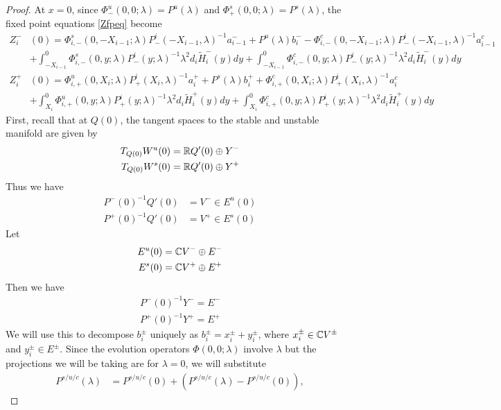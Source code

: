 \documentclass[thesis.tex]{subfiles}
\begin{document}
\begin{lemma}
\begin{proof}
At $x = 0$, since $\Phi^u_-(0, 0; \lambda) = P^u(\lambda)$ and $\Phi^s_+(0, 0; \lambda) = P^s(\lambda)$, 
the fixed point equations \eqref{Zfpeq} become
\begin{align*}
Z_i^-&(0) = \Phi^s_{i,-}(0, -X_{i-1}; \lambda) P^i_-(-X_{i-1}, \lambda)^{-1} a_{i-1}^- + P^u(\lambda) b_i^- - \Phi^c_{i,-}(0, -X_{i-1}; \lambda) P^i_-(-X_{i-1}, \lambda)^{-1} a_{i-1}^c \\
&+ \int_{-X_{i-1}}^0 \Phi^s_{i,-}(0, y; \lambda) P^i_-(y; \lambda)^{-1} \lambda^2 d_i \tilde{H}_i^-(y) dy + \int_{-X_{i-1}}^0 \Phi^c_{i,-}(0, y; \lambda) P^i_-(y; \lambda)^{-1} \lambda^2 d_i \tilde{H}_i^-(y) dy \\
Z_i^+&(0) = \Phi^u_{i,+}(0, X_i; \lambda) P^i_+(X_i, \lambda)^{-1} a_i^+ +  P^s(\lambda)b_i^+ + \Phi^c_{i,+}(0, X_i; \lambda) P^i_+(X_i, \lambda)^{-1} a_i^c \\
&+ \int_{X_i}^0 \Phi^u_{i,+}(0, y; \lambda) P^i_+(y; \lambda)^{-1} \lambda^2 d_i \tilde{H}_i^+(y) dy 
+ \int_{X_i}^0 \Phi^c_{i,+}(0, y; \lambda) P^i_+(y; \lambda)^{-1} \lambda^2 d_i \tilde{H}_i^+(y) dy 
\end{align*}
First, recall that at $Q(0)$, the tangent spaces to the stable and unstable manifold are given by
\begin{align*}
T_{Q(0)} W^u(0) &= \mathbb{R} Q'(0) \oplus Y^- \\
T_{Q(0)} W^s(0) &= \mathbb{R} Q'(0) \oplus Y^+
\end{align*}
Thus we have
\begin{align*}
P^-(0)^{-1} Q'(0) &= V^- \in E^u(0) \\
P^+(0)^{-1} Q'(0) &= V^+ \in E^s(0)
\end{align*}
Let
\begin{align*}
E^u(0) &= \mathbb{C} V^- \oplus E^- \\
E^s(0) &= \mathbb{C} V^+ \oplus E^+
\end{align*}
Then we have
\begin{align*}
P^-(0)^{-1} Y^- = E^- \\
P^+(0)^{-1} Y^+ = E^+
\end{align*}
We will use this to decompose $b_i^\pm$ uniquely as $b_i^\pm = x_i^\pm + y_i^\pm$, where $x_i^\pm \in \mathbb{C} V^\pm$ and $y_i^\pm \in E^\pm$. Since the evolution operators $\Phi(0, 0; \lambda)$ involve $\lambda$ but the projections we will be taking are for $\lambda = 0$, we will substitute
\begin{align*}
P^{s/u/c}(\lambda) &= P^{s/u/c}(0) + (P^{s/u/c}(\lambda) - P^{s/u/c}(0)),
\end{align*}

\end{proof}
\end{lemma}
\end{document}
